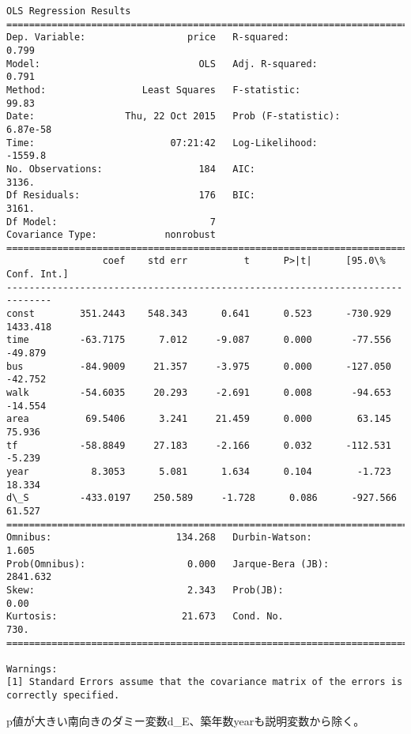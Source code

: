 \documentclass[a4paper,dvipdfmx]{jsarticle}
\begin{document}
    \begin{Verbatim}[commandchars=\\\{\}]
OLS Regression Results                            
==============================================================================
Dep. Variable:                  price   R-squared:                       0.799
Model:                            OLS   Adj. R-squared:                  0.791
Method:                 Least Squares   F-statistic:                     99.83
Date:                Thu, 22 Oct 2015   Prob (F-statistic):           6.87e-58
Time:                        07:21:42   Log-Likelihood:                -1559.8
No. Observations:                 184   AIC:                             3136.
Df Residuals:                     176   BIC:                             3161.
Df Model:                           7                                         
Covariance Type:            nonrobust                                         
==============================================================================
                 coef    std err          t      P>|t|      [95.0\% Conf. Int.]
------------------------------------------------------------------------------
const        351.2443    548.343      0.641      0.523      -730.929  1433.418
time         -63.7175      7.012     -9.087      0.000       -77.556   -49.879
bus          -84.9009     21.357     -3.975      0.000      -127.050   -42.752
walk         -54.6035     20.293     -2.691      0.008       -94.653   -14.554
area          69.5406      3.241     21.459      0.000        63.145    75.936
tf           -58.8849     27.183     -2.166      0.032      -112.531    -5.239
year           8.3053      5.081      1.634      0.104        -1.723    18.334
d\_S         -433.0197    250.589     -1.728      0.086      -927.566    61.527
==============================================================================
Omnibus:                      134.268   Durbin-Watson:                   1.605
Prob(Omnibus):                  0.000   Jarque-Bera (JB):             2841.632
Skew:                           2.343   Prob(JB):                         0.00
Kurtosis:                      21.673   Cond. No.                         730.
==============================================================================

Warnings:
[1] Standard Errors assume that the covariance matrix of the errors is correctly specified.
    \end{Verbatim}

    p値が大きい南向きのダミー変数d\_E、築年数yearも説明変数から除く。
\end{document}
